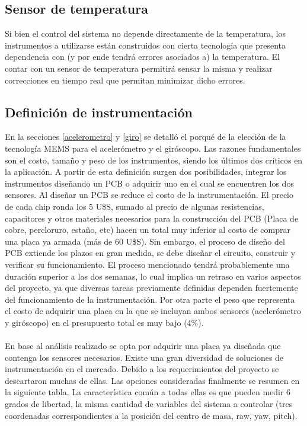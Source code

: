 \documentclass[main]{subfiles}
\begin{document}
\subsection{Sensor de temperatura}
\vspace*{15pt}
Si bien el control del sistema no depende directamente de la temperatura, los instrumentos a utilizarse est\'an construidos con cierta tecnolog\'ia que presenta dependencia con (y por ende tendr\'a errores asociados a) la temperatura. El contar con un sensor de temperatura permitir\'a sensar la misma y realizar correcciones en tiempo real que permitan minimizar dicho errores.

\subsection{Definici\'on de instrumentaci\'on}
\vspace*{15pt}


En la secciones \ref{acelerometro} y \ref{giro} se detall\'o el porqu\'e de la elecci\'on de la tecnolog\'ia MEMS para el aceler\'ometro y el gir\'oscopo. Las razones fundamentales son el costo, tama\~no y peso de los instrumentos, siendo los \'ultimos dos cr\'iticos en la aplicaci\'on.
A partir de esta definici\'on surgen dos posibilidades, integrar los instrumentos dise\~nando un PCB o adquirir uno en el cual se encuentren los dos sensores. Al dise\~nar un PCB se reduce el costo de la instrumentaci\'on. El precio de cada chip ronda los 5 U\$S, sumado al precio de algunas resistencias, capacitores y otros materiales necesarios para la construcci\'on del PCB (Placa de cobre, percloruro, esta\~no, etc) hacen un total muy inferior al costo de comprar una placa ya armada (m\'as de 60 U\$S). Sin embargo, el proceso de dise\~no del PCB extiende los plazos en gran medida, se debe dise\~nar el circuito, construir y verificar su funcionamiento. El proceso mencionado tendr\'a probablemente una duraci\'on superior a las dos semanas, lo cual implica un retraso en varios aspectos del proyecto, ya que diversas tareas previamente definidas dependen fuertemente del funcionamiento de la instrumentaci\'on. Por otra parte el peso que representa el costo de adquirir una placa en la que se incluyan ambos sensores (aceler\'ometro y gir\'oscopo) en el presupuesto total es muy bajo (4\%).\\
\\
En base al an\'alisis realizado se opta por adquirir una placa ya dise\~nada que contenga los sensores necesarios. Existe una gran diversidad de soluciones de instrumentaci\'on en el mercado. Debido a los requerimientos del proyecto se descartaron muchas de ellas. Las opciones consideradas finalmente se resumen en la siguiente tabla. La caracter\'istica com\'un a todas ellas es que pueden medir 6 grados de libertad, la misma cantidad de variables del sistema a controlar (tres coordenadas correspondientes a la posici\'on del centro de masa, raw, yaw, pitch).\\
\\ %
\end{document}
